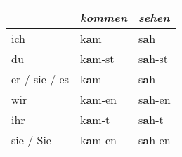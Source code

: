 \documentclass[a4paper,twocolumn,10pt]{article}
\newcommand{\tabularxtable}[3]
{

	\vspace{0.5cm}
	\nolinenumbers

	\begin{tabularx}{#1}{#2}
		#3
	\end{tabularx}

	\linenumbers
	\vspace{0.5cm}
}
\begin{document}
\tabularxtable
{0.95\linewidth}
{l|XX}
{
	&
	\textit{kommen} &
	\textit{sehen} \\
	\midrule


	\cellcolor{table-subtopic} ich &
	k\textcolor{green-goethe}{\textbf{a}}m &
	s\textcolor{green-goethe}{\textbf{a}}h \\

	\cellcolor{table-subtopic} du &
	\cellcolor{table-alternating-blue} k\textcolor{green-goethe}{\textbf{a}}m-st &
	\cellcolor{table-alternating-blue} s\textcolor{green-goethe}{\textbf{a}}h-st\\

	\cellcolor{table-subtopic} er / sie / es &
	k\textcolor{green-goethe}{\textbf{a}}m &
	s\textcolor{green-goethe}{\textbf{a}}h \\

	\cellcolor{table-subtopic} wir &
	\cellcolor{table-alternating-blue} k\textcolor{green-goethe}{\textbf{a}}m-en &
	\cellcolor{table-alternating-blue} s\textcolor{green-goethe}{\textbf{a}}h-en \\

	\cellcolor{table-subtopic} ihr &
	k\textcolor{green-goethe}{\textbf{a}}m-t &
	s\textcolor{green-goethe}{\textbf{a}}h-t \\

	\cellcolor{table-subtopic} sie / Sie &
	\cellcolor{table-alternating-blue} k\textcolor{green-goethe}{\textbf{a}}m-en &
	\cellcolor{table-alternating-blue} s\textcolor{green-goethe}{\textbf{a}}h-en \\

}


\end{document}
